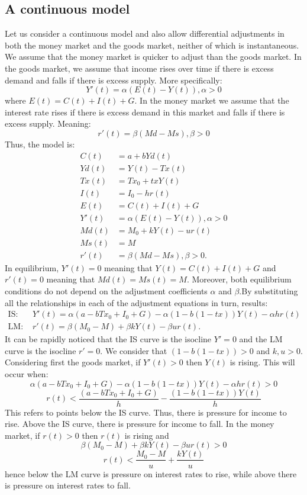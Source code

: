\documentclass[a4paper,12pt]{report}
\begin{document}
\subsection{A continuous model}
Let us consider a continuous model and also allow differential adjustments in both the money market and the goods market, neither of which is instantaneous. We assume that the money market is quicker to adjust than the goods market. In the goods market, we assume that income rises over time if there is excess demand and falls if there is excess supply. More specifically:
\begin{equation}
 Y'(t)=\alpha(E(t)-Y(t)), \alpha>0
\end{equation}
where $E(t)=C(t)+I(t)+G$. In the money market we assume that the interest rate rises if there is excess demand in this market and falls if there is excess supply. Meaning:
\begin{equation}
 r'(t)=\beta(Md-Ms),\beta>0
\end{equation}
Thus, the model is:
\begin{align}
 C(t)&=a+bYd(t) \\
 Yd(t)&=Y(t)-Tx(t) \\
 Tx(t)&=Tx_{0}+txY(t)\\
 I(t)&=I_{0}-hr(t)\\
 E(t)&=C(t)+I(t)+G\\
 Y'(t)&=\alpha(E(t)-Y(t)), \alpha>0\\
 Md(t)&=M_{0}+kY(t)-ur(t)\\
 Ms(t)&=M\\
 r'(t)&=\beta(Md-Ms),\beta>0.
\end{align}
In equilibrium, $Y'(t)=0$ meaning that $Y(t)=C(t)+I(t)+G$ and $r'(t)=0$ meaning that $Md(t)=Ms(t)=M$. Moreover, both equilibrium conditions do not depend on the adjustment coefficients $\alpha$ and $\beta$.By substituting all the relationships in each of the adjustment equations in turn, results:
\begin{align*}
 \text{IS: }&Y'(t)=\alpha(a-bTx_{0}+I_{0}+G)-\alpha(1-b(1-tx))Y(t)-\alpha hr(t) \\
 \text{LM: } &r'(t)=\beta(M_{0}-M)+\beta k Y(t)-\beta ur(t).
\end{align*}
It can be rapidly noticed that the IS curve is the isocline $Y'=0$ and the LM curve is the isocline $r'=0$. We consider that $(1-b(1-tx))>0$ and $k,u>0$.
Considering first the goods market, if $Y'(t)>0$ then $Y(t)$ is rising. This will occur when:
$$\alpha(a-bTx_{0}+I_{0}+G)-\alpha(1-b(1-tx))Y(t)-\alpha hr(t)>0$$
$$r(t)<\frac{(a-bTx_{0}+I_{0}+G)}{h}-\frac{(1-b(1-tx))Y(t)}{h}$$
This refers to points below the IS curve. Thus, there is pressure for income to rise. Above the IS curve, there is pressure for income to fall.
In the money market, if $r(t)>0$ then $r(t)$ is rising and
$$\beta(M_{0}-M)+\beta kY(t)-\beta ur(t)>0$$
$$r(t)<\frac{M_{0}-M}{u}+\frac{kY(t)}{u}$$
hence below the LM curve is pressure on interest rates to rise, while above there is pressure on interest rates to fall. 
\end{document}
